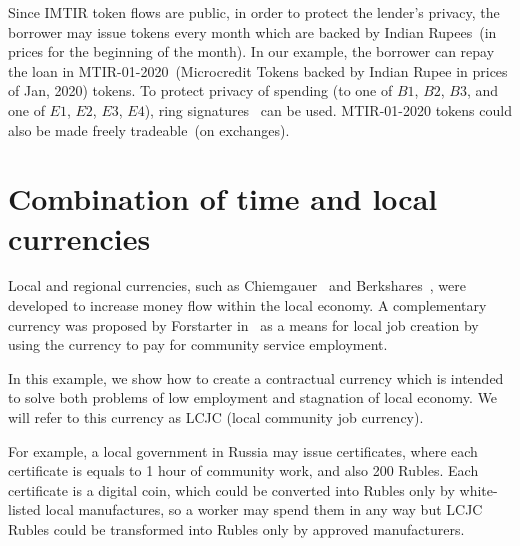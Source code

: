\documentclass[]{llncs}   %
\begin{document}
Since IMTIR token flows are public, in order to protect the lender's privacy, the borrower
 may issue tokens every month which are backed by Indian Rupees~(in prices for the beginning of the month). In our example, the borrower can repay the loan in MTIR-01-2020~(Microcredit Tokens backed by Indian Rupee in prices of
 Jan, 2020) tokens. To protect privacy of spending (to one of $B1$, $B2$, $B3$, and one of $E1$, $E2$, $E3$, $E4$), ring
 signatures~\cite{rivest2001leak} can be used. MTIR-01-2020 tokens could also be made freely tradeable~(on exchanges). 

\section{Combination of time and local currencies}
\label{sec-combination}

Local and regional currencies, such as Chiemgauer~\cite{thiel2011complementary} and Berkshares~\cite{swann1995local}, were developed to increase money flow within the local economy.
A complementary currency was proposed by Forstarter in~\cite{forstater2018complementary} as a means for local job creation by using the currency to pay for community service employment.

In this example, we show how to create a contractual currency which is intended to solve both problems of low
employment and stagnation of local economy. We will refer to this currency as LCJC (local community job currency).

For example, a local government in Russia may issue certificates, where each certificate is equals to 1 hour of community work, and also 200 Rubles. Each certificate is a digital coin, which could be converted into Rubles only by white-listed local manufactures, so a worker may spend them in any way but LCJC Rubles could be transformed into Rubles only by approved manufacturers.
\end{document}
